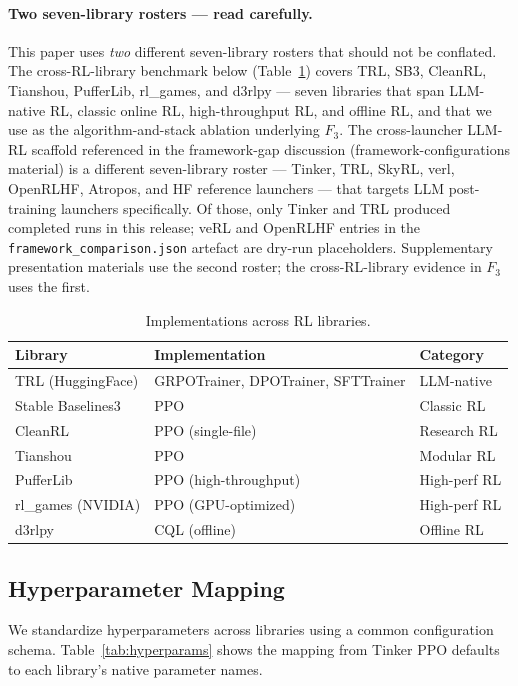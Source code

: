 \documentclass{article}
\begin{document}
\paragraph{Two seven-library rosters --- read carefully.}
This paper uses \emph{two} different seven-library rosters that
should not be conflated. The cross-RL-library benchmark below
(Table~\ref{tab:implementations}) covers TRL, SB3, CleanRL, Tianshou,
PufferLib, rl\_games, and d3rlpy --- seven libraries that span
LLM-native RL, classic online RL, high-throughput RL, and offline RL,
and that we use as the algorithm-and-stack ablation underlying $F_3$.
The cross-launcher LLM-RL scaffold referenced in the framework-gap
discussion (framework-configurations material) is a different seven-library
roster --- Tinker, TRL, SkyRL, verl, OpenRLHF, Atropos, and HF
reference launchers --- that targets LLM post-training launchers
specifically. Of those, only Tinker and TRL produced completed
runs in this release; veRL and OpenRLHF entries in the
\texttt{framework\_comparison.json} artefact are dry-run
placeholders. Supplementary presentation materials use the second roster; the
cross-RL-library evidence in $F_3$ uses the first.


\begin{table}[htbp]
\centering
\caption{Implementations across RL libraries.}
\label{tab:implementations}
\begin{tabular}{lll}
\toprule
\textbf{Library} & \textbf{Implementation} & \textbf{Category} \\
\midrule
TRL (HuggingFace) & GRPOTrainer, DPOTrainer, SFTTrainer & LLM-native \\
Stable Baselines3 & PPO & Classic RL \\
CleanRL & PPO (single-file) & Research RL \\
Tianshou & PPO & Modular RL \\
PufferLib & PPO (high-throughput) & High-perf RL \\
rl\_games (NVIDIA) & PPO (GPU-optimized) & High-perf RL \\
d3rlpy & CQL (offline) & Offline RL \\
\bottomrule
\end{tabular}
\end{table}

\subsection{Hyperparameter Mapping}

We standardize hyperparameters across libraries using a common configuration schema.
Table~\ref{tab:hyperparams} shows the mapping from Tinker PPO defaults to each library's
native parameter names.
\end{document}

